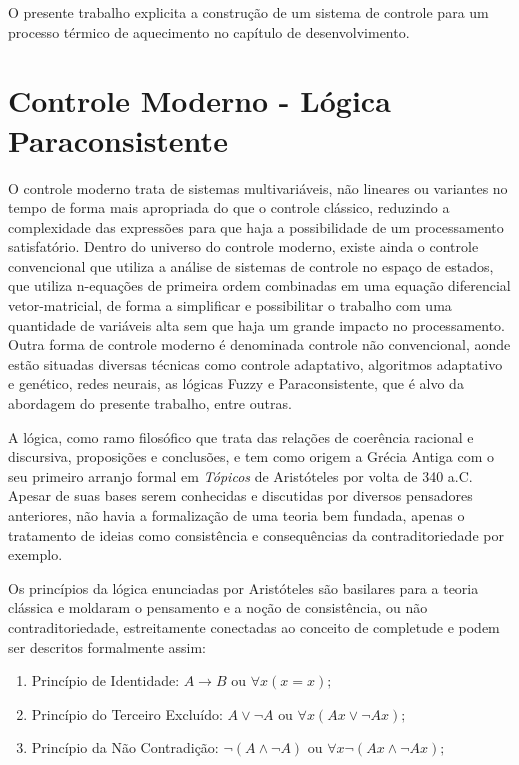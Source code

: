 O presente trabalho explicita a construção de um sistema de controle para um processo térmico de aquecimento no capítulo de desenvolvimento.



\newpage
\section{Controle Moderno - Lógica Paraconsistente}
O controle moderno trata de sistemas multivariáveis, não lineares ou variantes no tempo de forma mais apropriada do que o controle clássico, reduzindo a complexidade das expressões para que haja a possibilidade de um processamento satisfatório.
Dentro do universo do controle moderno, existe ainda o controle convencional que utiliza a análise de sistemas de controle no espaço de estados, que utiliza n-equações de primeira ordem combinadas em uma equação diferencial vetor-matricial, de forma a simplificar e possibilitar o trabalho com uma quantidade de variáveis alta sem que haja um grande impacto no processamento.  \citep{Ogata} 
Outra forma de controle moderno é denominada controle não convencional, aonde estão situadas diversas técnicas como controle adaptativo, algoritmos adaptativo e genético, redes neurais, as lógicas Fuzzy e Paraconsistente, que é alvo da abordagem do presente trabalho, entre outras.

A lógica, como ramo filosófico que trata das relações de coerência racional e discursiva, proposições e conclusões, e tem como origem a Grécia Antiga com o seu primeiro arranjo formal em \emph{Tópicos} de Aristóteles por volta de 340 a.C. Apesar de suas bases serem conhecidas e discutidas por diversos pensadores anteriores, não havia a formalização de uma teoria bem fundada, apenas o tratamento de ideias como consistência e consequências da contraditoriedade por exemplo. 

Os princípios da lógica enunciadas por Aristóteles são basilares para a teoria clássica e moldaram o pensamento e a noção de consistência, ou não contraditoriedade, estreitamente conectadas ao conceito de completude e podem ser descritos formalmente assim:


\begin{enumerate}
\item Princípio de Identidade: 
    \begin{math}
	A \rightarrow B 
	\textrm{ ou } 
	\forall x(x=x);
    \end{math}

\item Princípio do Terceiro Excluído:
    \begin{math}
	A \vee \neg A
	\textrm{ ou }
	\forall x(Ax \vee \neg Ax);
    \end{math}

\item Princípio da Não Contradição: 
    \begin{math}
	\neg (A \wedge \neg A)
	\textrm{ ou }
	\forall x\neg(Ax \wedge \neg Ax);
    \end{math}

\end{enumerate}

